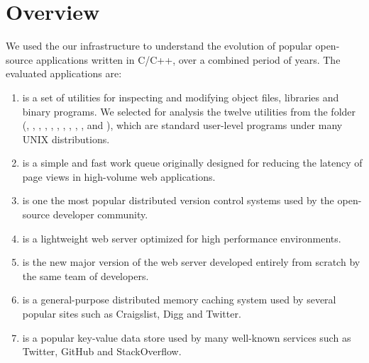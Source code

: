 \section{Overview}
\label{evolution:overview}

We used the our infrastructure to understand the evolution of \numSystems
popular open-source applications written in C/C++, over a combined period of
\numYears years. The \numSystems evaluated applications are:

\begin{enumerate}

\item[\gnu~\binutils\footnote{\url{http://www.gnu.org/software/binutils/}}]
is a set of utilities for inspecting and modifying object files,
libraries and binary programs.  We selected for analysis the twelve
utilities from the  folder (, ,
, , , , ,
, , ,  and ),
which are standard user-level programs under many UNIX distributions.

\item[\beanstalkd\footnote{\url{http://kr.github.io/beanstalkd/}}]
is a simple and fast work queue originally designed for reducing the latency of
page views in high-volume web applications.

\item[\git\footnote{\url{http://git-scm.com/}}]
is one the most popular distributed version control systems used by the
open-source developer community.

\item[\lighttpd\footnote{\url{http://www.lighttpd.net/}}]
is a lightweight web server optimized for high performance environments.

\item[\lighttpdtwo\footnote{\url{http://redmine.lighttpdtwo.net/projects/lighttpdtwo2/}}]
is the new major version of the \lighttpd web server developed entirely from
scratch by the same team of developers.

\item[\memcached\footnote{\url{http://memcached.org/}}]
is a general-purpose distributed memory caching system used by several popular
sites such as Craigslist, Digg and Twitter.

\item[\redis\footnote{\url{http://redis.io/}}]
is a popular key-value data store used by many well-known services such as
Twitter, GitHub and StackOverflow.


\end{enumerate}
